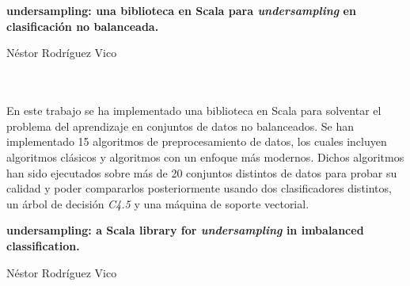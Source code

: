 \chapter*{}



\cleardoublepage
\thispagestyle{empty}

\begin{center}
{\large\bfseries undersampling: una biblioteca en Scala para \textit{undersampling} en clasificación no balanceada.}\\
\end{center}
\begin{center}
Néstor Rodríguez Vico\\
\end{center}

\\

\vspace{0.7cm}
\\

En este trabajo se ha implementado una biblioteca en Scala para solventar el problema del aprendizaje en conjuntos de datos no balanceados. Se han implementado 15 algoritmos de preprocesamiento de datos, los cuales incluyen algoritmos clásicos y algoritmos con un enfoque más modernos. Dichos algoritmos han sido ejecutados sobre más de 20 conjuntos distintos de datos para probar su calidad y poder compararlos posteriormente usando dos clasificadores distintos, un árbol de decisión \textit{C4.5} y una máquina de soporte vectorial.
\cleardoublepage

\thispagestyle{empty}

\begin{center}
{\large\bfseries undersampling: a Scala library for \textit{undersampling} in imbalanced classification.}\\
\end{center}
\begin{center}
Néstor Rodríguez Vico\\
\end{center}

\\

\vspace{0.7cm}
\\

